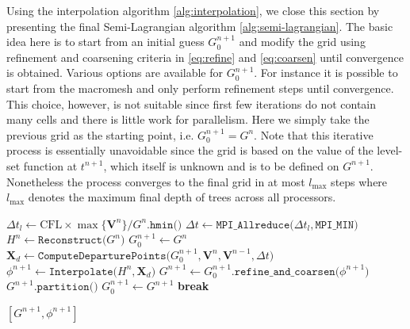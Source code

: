 Using the interpolation algorithm \ref{alg:interpolation}, we close this section by presenting the final Semi-Lagrangian algorithm \ref{alg:semi-lagrangian}. The basic idea here is to start from an initial guess $G^{n+1}_0$ and modify the grid using refinement and coarsening criteria in \eqref{eq:refine} and \eqref{eq:coarsen} until convergence is obtained. Various options are available for $G^{n+1}_0$. For instance it is possible to start from the macromesh and only perform refinement steps until convergence. This choice, however, is not suitable since first few iterations do not contain many cells and there is little work for parallelism. Here we simply take the previous grid as the starting point, i.e. $G^{n+1}_0 = G^n$. Note that this iterative process is essentially unavoidable since the grid is based on the value of the level-set function at $t^{n+1}$, which itself is unknown and is to be defined on $G^{n+1}$. Nonetheless the process converges to the final grid in at most $l_{\max}$ steps where $l_{\max}$ denotes the maximum final depth of trees across all processors.
\begin{algorithm}[htbp]
\caption{$[G^{n+1}, \phi^{n+1}] \gets \texttt{SemiLagrangian (}G^n, \phi^n, \mathbf{V}^n, \mathbf{V}^{n-1}, \text{CFL}\texttt{)}$} %
\begin{algorithmic}[1]
\State $\Delta t_l \gets \text{CFL} \times \max \{\mathbf{V}^n\} / G^n.\texttt{hmin()}$
\State $\Delta t   \gets \texttt{MPI\_Allreduce(}\Delta t_l,\texttt{MPI\_MIN)}$
\State $H^n \gets \texttt{Reconstruct(} G^n\texttt{)}$ 
\State $G^{n+1}_0 \gets G^n$
	\State $\mathbf{X}_d  \gets \texttt{ComputeDeparturePoints(}G^{n+1}_0, \mathbf{V}^n, \mathbf{V}^{n-1}, \Delta t\texttt{)}$ 
	\State $\phi^{n+1} \gets \texttt{Interpolate(}H^n, \textbf{X}_d\texttt{)}$
	\State $G^{n+1} \gets G^{n+1}_0.\texttt{refine\_and\_coarsen(}\phi^{n+1}\texttt{)}$ 
		\State $G^{n+1}.\texttt{partition()}$
		\State $G^{n+1}_0 \gets G^{n+1}$
	\Else
		\State \textbf{break}
	\EndIf
\EndWhile

\State \Return $[G^{n+1}, \phi^{n+1}]$
\end{algorithmic}
\label{alg:semi-lagrangian}
\end{algorithm}

